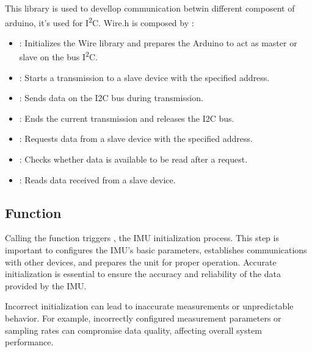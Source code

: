 This library is used to devellop communication betwin different composent of arduino, it's used for I\textsuperscript{2}C. Wire.h is composed by  \cite{arduino_wire:2024} : 
\begin{itemize}
	
	\item {}: Initializes the Wire library and prepares the Arduino to act as master or slave on the bus I\textsuperscript{2}C.
	\item {}: Starts a transmission to a slave device with the specified address.
	\item {} : Sends data on the I2C bus during transmission.
	\item {} : Ends the current transmission and releases the I2C bus.
	\item {} : Requests data from a slave device with the specified address.
	\item {}: Checks whether data is available to be read after a request.
	\item {}: Reads data received from a slave device.

\end{itemize}


\begin{code}
	
	
	 \caption{Simple sketch using the sensor LSM9DS1 detection.}\label{TestWire}
	 
\end{code}


\subsection{Function }


Calling the function triggers  , the IMU initialization process. This step is important to configures the IMU's basic parameters, establishes communications with other devices, and prepares the unit for proper operation. Accurate initialization is essential to ensure the accuracy and reliability of the data provided by the IMU. \cite{arduino_lsm9ds1:2024}

Incorrect initialization can lead to inaccurate measurements or unpredictable behavior. For example, incorrectly configured measurement parameters or sampling rates can compromise data quality, affecting overall system performance.


